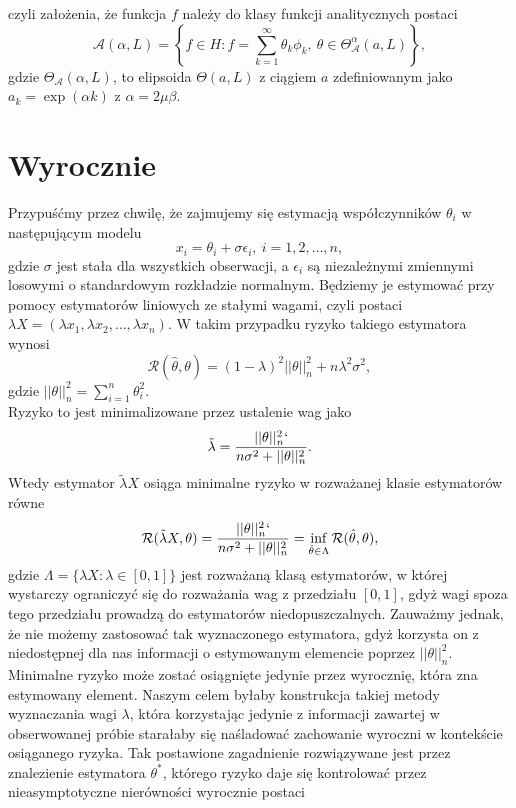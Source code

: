 \documentclass{mwart}
\begin{document}
czyli założenia, że funkcja $f$ należy do klasy funkcji analitycznych postaci
\begin{displaymath}
\mathcal{A}(\alpha,L)=\left\{f\in H\colon f=\sum_{k=1}^{\infty}\theta_k\phi_k,\ \theta\in \Theta_{\mathcal{A}}^{\alpha}(a,L)\right\},
\end{displaymath}
gdzie  $\Theta_{\mathcal{A}}(\alpha,L)$, to elipsoida $\Theta (a,L)$ z ciągiem $a$ zdefiniowanym jako $a_k=\exp (\alpha k)$ z $\alpha = 2\mu \beta$.












\section{Wyrocznie}
Przypuśćmy przez chwilę, że zajmujemy się estymacją współczynników $\theta_i$ w następującym modelu 
\begin{displaymath}
x_i=\theta_i+\sigma\epsilon_i,\ i=1,2,\dots,n,
\end{displaymath}
gdzie $\sigma$ jest stała dla wszystkich obserwacji, a $\epsilon_i$ są niezależnymi zmiennymi losowymi o standardowym rozkładzie normalnym. Będziemy je estymować przy pomocy estymatorów liniowych ze stałymi wagami, czyli postaci $\lambda X=(\lambda x_1,\lambda x_2,\dots, \lambda x_n)$. W takim przypadku ryzyko takiego estymatora wynosi 
\begin{displaymath}
\mathcal{R}(\hat{\theta},\theta)=(1-\lambda)^2||\theta||^2_n+n\lambda^2\sigma^2,
\end{displaymath}
gdzie $||\theta||_n^2=\sum_{i=1}^n\theta_i^2$.\\
Ryzyko to jest minimalizowane przez ustalenie wag jako
\begin{displaymath}
\tilde{\lambda}=\frac{||\theta||^2_n`}{n\sigma^2+||\theta||^2_n}.
\end{displaymath}
Wtedy estymator $\tilde{\lambda}X$ osiąga minimalne ryzyko w rozważanej klasie estymatorów równe
\begin{displaymath}
\mathcal{R}(\tilde{\lambda}X,\theta)=\frac{||\theta||^2_n`}{n\sigma^2+||\theta||^2_n}=\inf_{\hat{\theta} \in \Lambda}\mathcal{R}(\hat{\theta},\theta),
\end{displaymath}
gdzie $\Lambda=\{\lambda X\colon \lambda\in [0,1]\}$ jest rozważaną klasą estymatorów, w której wystarczy ograniczyć się do rozważania wag z przedziału $[0,1]$, gdyż wagi spoza tego przedziału prowadzą do estymatorów niedopuszczalnych. Zauważmy jednak, że nie możemy zastosować tak wyznaczonego estymatora, gdyż korzysta on z niedostępnej dla nas informacji o estymowanym elemencie poprzez $||\theta||_n^2$. Minimalne ryzyko może zostać osiągnięte jedynie przez wyrocznię, która zna estymowany element. Naszym celem byłaby konstrukcja takiej metody wyznaczania wagi $\lambda$, która korzystając jedynie z informacji zawartej w obserwowanej próbie starałaby się naśladować zachowanie wyroczni w kontekście osiąganego ryzyka. Tak postawione zagadnienie rozwiązywane jest przez znalezienie estymatora $\theta^*$, którego ryzyko daje się kontrolować przez nieasymptotyczne nierówności wyrocznie postaci 
\end{document}
